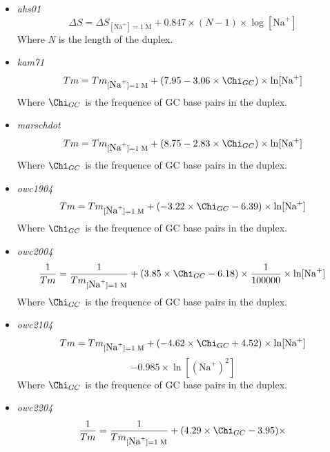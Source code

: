 \documentclass{article}
\begin{document}
 \begin{itemize}
 \item \textit{ahs01}
 \begin{displaymath}
  \Delta{}S=\Delta{}S_{[\mbox{Na}^+]=1\;\mathrm{M}}+0.847 \times (N - 1) \times \log [\mbox{Na}^+]   
 \end{displaymath}
 Where \emph{N} is the length of the duplex.
 \item \textit{kam71}
 \begin{displaymath}
  Tm=Tm_{[\mbox{Na}^+]=1\;\mathrm{M}}+(7.95 - 3.06 \times \Chi_{GC}) \times \ln [\mbox{Na}^+]  
 \end{displaymath}
 Where \emph{$\Chi_{GC}$} is the frequence of GC base pairs in the duplex.
 \item \textit{marschdot}
 \begin{displaymath}
  Tm=Tm_{[\mbox{Na}^+]=1\;\mathrm{M}}+ (8.75 - 2.83 \times \Chi_{GC}) \times \ln [\mbox{Na}^+]  
 \end{displaymath}
 Where \emph{$\Chi_{GC}$} is the frequence of GC base pairs in the duplex.
 \item \textit{owc1904}
 \begin{displaymath}
  Tm=Tm_{[\mbox{Na}^+]=1\;\mathrm{M}}+ (-3.22 \times \Chi_{GC} - 6.39) \times \ln [\mbox{Na}^+]  
 \end{displaymath}
 Where \emph{$\Chi_{GC}$} is the frequence of GC base pairs in the duplex.
 \item \textit{owc2004}
 \begin{displaymath}
 \frac{1}{Tm}=\frac{1}{Tm_{[\mbox{Na}^+]=1\;\mathrm{M}}}+ (3.85 \times \Chi_{GC} - 6.18) \times \frac{1}{100000} \times \ln [\mbox{Na}^+]  
 \end{displaymath}
 Where \emph{$\Chi_{GC}$} is the frequence of GC base pairs in the duplex.
 \item \textit{owc2104}
 \begin{displaymath}
 Tm=Tm_{[\mbox{Na}^+]=1\;\mathrm{M}}+ (-4.62 \times \Chi_{GC} + 4.52) \times \ln [\mbox{Na}^+] 
 \end{displaymath}
 \begin{displaymath}
 - 0.985 \times \ln [(\mbox{Na}^+)^2]  
 \end{displaymath}
 Where \emph{$\Chi_{GC}$} is the frequence of GC base pairs in the duplex.
 \item \textit{owc2204}
 \begin{multline*}
 \frac{1}{Tm}=\frac{1}{Tm_{[\mbox{Na}^+]=1\;\mathrm{M}}}+ (4.29 \times \Chi_{GC} - 3.95) \times 
 \end{multline*}

\end{itemize}
\end{document}
